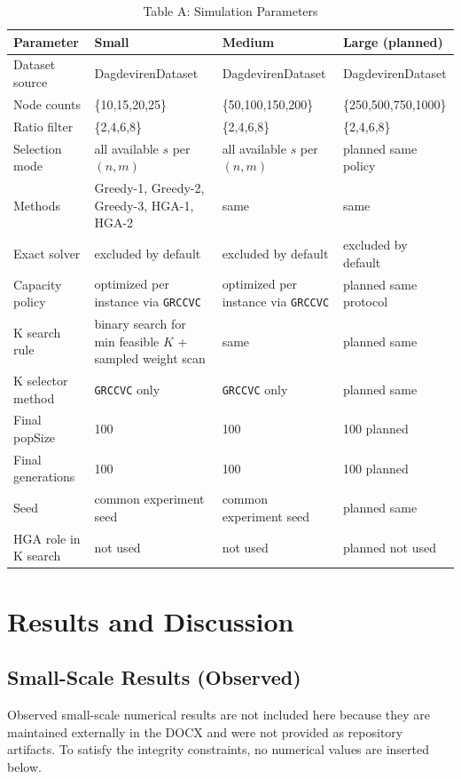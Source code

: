 \documentclass[11pt]{article}
\begin{document}
\begin{table}[h]
\centering
\caption{Table A: Simulation Parameters}
\label{tab:sim-params}
\begin{tabular}{p{3.0cm}p{3.1cm}p{3.1cm}p{3.1cm}}
\toprule
Parameter & Small & Medium & Large (planned) \\
\midrule
Dataset source & DagdevirenDataset & DagdevirenDataset & DagdevirenDataset \\
Node counts & \{10,15,20,25\} & \{50,100,150,200\} & \{250,500,750,1000\} \\
Ratio filter & \{2,4,6,8\} & \{2,4,6,8\} & \{2,4,6,8\} \\
Selection mode & all available \(s\) per \((n,m)\) & all available \(s\) per \((n,m)\) & planned same policy \\
Methods & Greedy-1, Greedy-2, Greedy-3, HGA-1, HGA-2 & same & same \\
Exact solver & excluded by default & excluded by default & excluded by default \\
Capacity policy & optimized per instance via \texttt{GRCCVC} & optimized per instance via \texttt{GRCCVC} & planned same protocol \\
K search rule & binary search for min feasible \(K\) + sampled weight scan & same & planned same \\
K selector method & \texttt{GRCCVC} only & \texttt{GRCCVC} only & planned same \\
Final popSize & 100 & 100 & 100 planned \\
Final generations & 100 & 100 & 100 planned \\
Seed & common experiment seed & common experiment seed & planned same \\
HGA role in K search & not used & not used & planned not used \\
\bottomrule
\end{tabular}
\end{table}

\section{Results and Discussion}

\subsection{Small-Scale Results (Observed)}

Observed small-scale numerical results are not included here because they are maintained externally in the DOCX and were not provided as repository artifacts. To satisfy the integrity constraints, no numerical values are inserted below.
\end{document}
